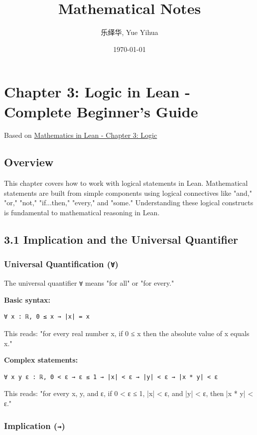 \documentclass{amsart}
\author{乐绎华, Yue Yihua}
\date{\today}
\title{Mathematical Notes}
\theoremstyle{plain}
\theoremstyle{definition}
\theoremstyle{remark}
\begin{document}
\maketitle
\tableofcontents

\chapter{Chapter 3: Logic in Lean - Complete Beginner's Guide}

Based on \href{https://leanprover-community.github.io/mathematics_in_lean/C03_Logic.html}{Mathematics in Lean - Chapter 3: Logic}

\section{Overview}

This chapter covers how to work with logical statements in Lean. Mathematical statements are built from simple components using logical connectives like "and," "or," "not," "if...then," "every," and "some." Understanding these logical constructs is fundamental to mathematical reasoning in Lean.

\section{3.1 Implication and the Universal Quantifier}

\subsection{Universal Quantification (\lstinline{∀})}

The universal quantifier \lstinline{∀} means "for all" or "for every."

\textbf{Basic syntax:}

\begin{lstlisting}[language=lean]
∀ x : ℝ, 0 ≤ x → |x| = x
\end{lstlisting}
This reads: "for every real number x, if 0 ≤ x then the absolute value of x equals x."

\textbf{Complex statements:}

\begin{lstlisting}[language=lean]
∀ x y ε : ℝ, 0 < ε → ε ≤ 1 → |x| < ε → |y| < ε → |x * y| < ε
\end{lstlisting}
This reads: "for every x, y, and ε, if 0 < ε ≤ 1, |x| < ε, and |y| < ε, then |x * y| < ε."

\subsection{Implication (\lstinline{→})}
\end{document}
